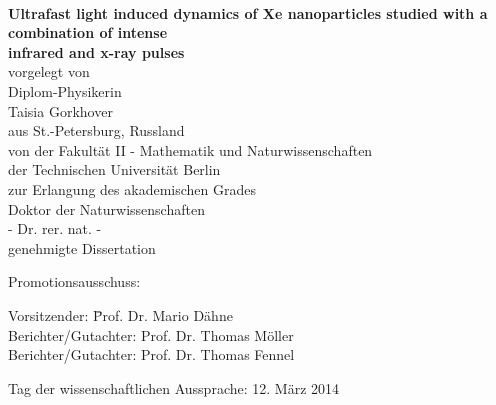 \thispagestyle{empty}

\begin{center}

\hspace{1mm} \vspace{3mm}\hspace{1mm}\\%
{\LARGE \textbf{Ultrafast light induced dynamics of Xe nanoparticles studied with a 
combination of intense \\ infrared and x-ray pulses\vspace{20mm}\\}}%
{\large %
vorgelegt von
\vspace{2mm}\\
Diplom-Physikerin}%
\vspace{2mm}\\
%
{\Large Taisia Gorkhover}
\vspace{2mm}\\
%
{\large aus St.-Petersburg, Russland} %
\vspace{20mm}
\\

{\large %
von der Fakult\"{a}t II - Mathematik und Naturwissenschaften
\vspace{1mm}\\
der Technischen Universit\"{a}t Berlin
\vspace{1mm}\\
zur Erlangung des akademischen Grades
%
\vspace{5mm}
\\

Doktor der Naturwissenschaften
\vspace{1mm}\\
- Dr. rer. nat. -
%
\vspace{10mm}
\\


genehmigte Dissertation
\vspace{10mm}}
\\


\end{center}

{\large %
Promotionsausschuss:
%
%
\begin{tabbing}
%
Vorsitzender:\hspace{20mm} \= Prof. Dr. Mario D\"{a}hne \\
Berichter/Gutachter: \> Prof. Dr. Thomas M\"{o}ller \\
Berichter/Gutachter: \> Prof. Dr. Thomas Fennel
%

\end{tabbing}
%
Tag der wissenschaftlichen Aussprache: 12. M\"{a}rz 2014
}
 \hspace{1mm}\vspace{5mm}\\

